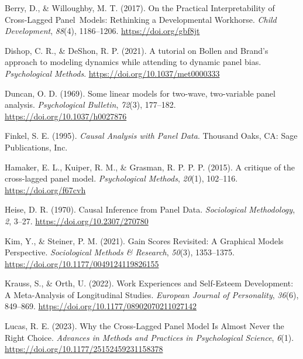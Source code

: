 \documentclass[
  man,floatsintext]{apa6}
\newlength{\cslhangindent}
\newenvironment{CSLReferences}[2] %
 {\begin{list}{}{%
  \setlength{\itemindent}{0pt}
  \setlength{\leftmargin}{0pt}
  \setlength{\parsep}{0pt}
  \ifodd #1
   \setlength{\leftmargin}{\cslhangindent}
   \setlength{\itemindent}{-1\cslhangindent}
  \fi
  \setlength{\itemsep}{#2\baselineskip}}}
 {\end{list}}
\begin{document}
\label{refs}
\begin{CSLReferences}{1}{0}
Berry, D., \& Willoughby, M. T. (2017). On the {Practical Interpretability} of {Cross-Lagged Panel~Models}: {Rethinking} a {Developmental Workhorse}. \emph{Child Development}, \emph{88}(4), 1186--1206. \url{https://doi.org/gbf8jt}

Dishop, C. R., \& DeShon, R. P. (2021). A tutorial on {Bollen} and {Brand}'s approach to modeling dynamics while attending to dynamic panel bias. \emph{Psychological Methods}. \url{https://doi.org/10.1037/met0000333}

Duncan, O. D. (1969). Some linear models for two-wave, two-variable panel analysis. \emph{Psychological Bulletin}, \emph{72}(3), 177--182. \url{https://doi.org/10.1037/h0027876}

Finkel, S. E. (1995). \emph{Causal {Analysis} with {Panel Data}}. Thousand Oaks, CA: Sage Publications, Inc.

Hamaker, E. L., Kuiper, R. M., \& Grasman, R. P. P. P. (2015). A critique of the cross-lagged panel model. \emph{Psychological Methods}, \emph{20}(1), 102--116. \url{https://doi.org/f67cvh}

Heise, D. R. (1970). Causal {Inference} from {Panel Data}. \emph{Sociological Methodology}, \emph{2}, 3--27. \url{https://doi.org/10.2307/270780}

Kim, Y., \& Steiner, P. M. (2021). Gain {Scores Revisited}: {A Graphical Models Perspective}. \emph{Sociological Methods \& Research}, \emph{50}(3), 1353--1375. \url{https://doi.org/10.1177/0049124119826155}

Krauss, S., \& Orth, U. (2022). Work {Experiences} and {Self-Esteem Development}: {A Meta-Analysis} of {Longitudinal Studies}. \emph{European Journal of Personality}, \emph{36}(6), 849--869. \url{https://doi.org/10.1177/08902070211027142}

Lucas, R. E. (2023). Why the {Cross-Lagged Panel Model Is Almost Never} the {Right Choice}. \emph{Advances in Methods and Practices in Psychological Science}, \emph{6}(1). \url{https://doi.org/10.1177/25152459231158378}


\end{CSLReferences}
\end{document}
